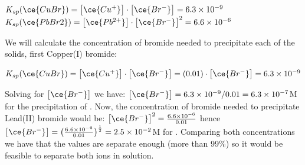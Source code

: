 \documentclass[main.tex]{subfiles}
\begin{document}
\begin{description}
\begin{center}
\hfill $K_{sp}(\ce{CuBr})= \big[ \ce{Cu^{+}} \big]\cdot \big[ \ce{Br^{-}} \big]=6.3\times 10^{-9}$\\
\hfill $K_{sp}(\ce{PbBr2})= \big[ \ce{Pb^{2+}} \big]\cdot \big[ \ce{Br^{-}} \big]^2=6.6\times 10^{-6}$
\end{center}
We will calculate the concentration of bromide needed to precipitate each of the solids, first Copper(I) bromide:
\begin{center}
$K_{sp}(\ce{CuBr})= \big[ \ce{Cu^{+}} \big]\cdot \big[ \ce{Br^{-}} \big]=(0.01)\cdot\big[ \ce{Br^{-}} \big]=6.3\times 10^{-9}$\\
\end{center}
Solving for $\big[ \ce{Br^{-}} \big]$ we have: $\big[ \ce{Br^{-}} \big]=6.3\times 10^{-9}/0.01=6.3\times 10^{-7}$M for the precipitation of . Now, the concentration of bromide needed to precipitate Lead(II) bromide would be:
$ \big[ \ce{Br^{-}} \big]^2=\frac{6.6\times 10^{-6}}{0.01}$ hence $ \big[ \ce{Br^{-}} \big]=\big(\frac{6.6\times 10^{-6}}{0.01}\big)^{\frac{1}{2}}=2.5\times 10^{-2}$M for . Comparing both concentrations we have that the values are separate enough (more than 99\%) so it would be feasible to separate both ions in solution.
\end{description}
\end{document}
